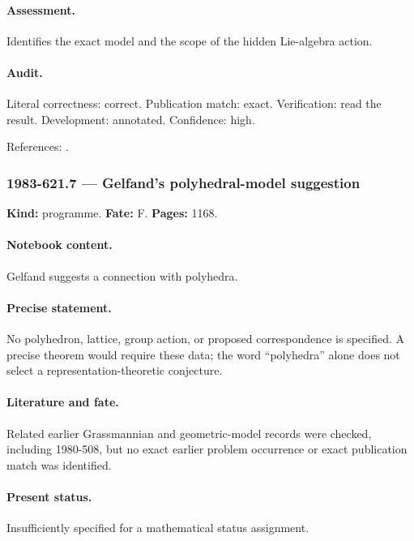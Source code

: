\paragraph{Assessment.} Identifies the exact model and the scope of the hidden Lie-algebra action.

\paragraph{Audit.} Literal correctness: correct. Publication match: exact. Verification: read the result. Development: annotated. Confidence: high.

\noindent References: \citep{gelfandzelevinsky1984models}.\par

\subsubsection{1983-621.7 --- Gelfand’s polyhedral-model suggestion}

\label{item:1983-621.7}

\noindent\textbf{Kind:} programme. \textbf{Fate:} F. \textbf{Pages:} 1168.\par

\paragraph{Notebook content.} Gelfand suggests a connection with polyhedra.

\paragraph{Precise statement.} No polyhedron, lattice, group action, or proposed correspondence is specified. A precise theorem would require these data; the word “polyhedra” alone does not select a representation-theoretic conjecture.

\paragraph{Literature and fate.} Related earlier Grassmannian and geometric-model records were checked, including 1980-508, but no exact earlier problem occurrence or exact publication match was identified.

\paragraph{Present status.} Insufficiently specified for a mathematical status assignment.

